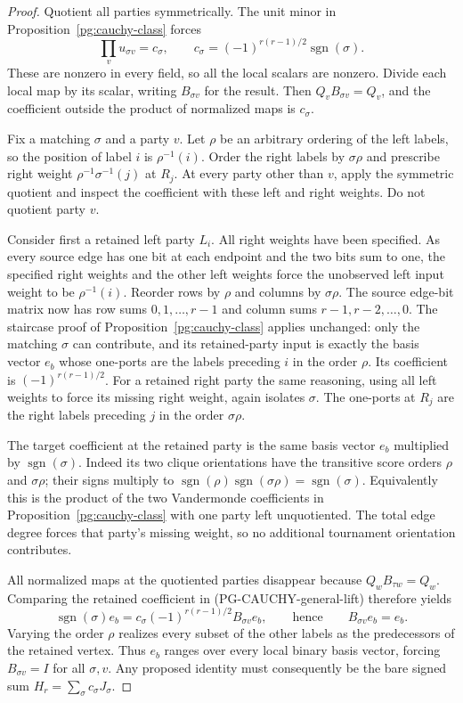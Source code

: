 \begin{proof}
Quotient all parties symmetrically. The unit minor in
Proposition~\ref{pg:cauchy-class} forces
\[
 \prod_vu_{\sigma v}=c_\sigma,
 \qquad c_\sigma=(-1)^{r(r-1)/2}\operatorname{sgn}(\sigma).
\]
These are nonzero in every field, so all the local scalars are nonzero.
Divide each local map by its scalar, writing $B_{\sigma v}$ for the result.
Then $Q_vB_{\sigma v}=Q_v$, and the coefficient outside the product of
normalized maps is $c_\sigma$.

Fix a matching $\sigma$ and a party $v$. Let $\rho$ be an arbitrary ordering
of the left labels, so the position of label $i$ is $\rho^{-1}(i)$.
Order the right labels by $\sigma\rho$ and prescribe right weight
$\rho^{-1}\sigma^{-1}(j)$ at $R_j$. At every party other than $v$, apply
the symmetric quotient and inspect the coefficient with these left and
right weights. Do not quotient party $v$.

Consider first a retained left party $L_i$. All right weights have been
specified. As every source edge has one bit at each endpoint and the two
bits sum to one, the specified right weights and the other left weights
force the unobserved left input weight to be $\rho^{-1}(i)$. Reorder rows
by $\rho$ and columns by $\sigma\rho$. The source edge-bit matrix now has
row sums $0,1,\ldots,r-1$ and column sums $r-1,r-2,\ldots,0$.
The staircase proof of Proposition~\ref{pg:cauchy-class} applies unchanged:
only the matching $\sigma$ can contribute, and its retained-party input is
exactly the basis vector $e_b$ whose one-ports are the labels preceding
$i$ in the order $\rho$. Its coefficient is $(-1)^{r(r-1)/2}$.
For a retained right party the same reasoning, using all left weights to
force its missing right weight, again isolates $\sigma$. The one-ports at
$R_j$ are the right labels preceding $j$ in the order $\sigma\rho$.

The target coefficient at the retained party is the same basis vector
$e_b$ multiplied by $\operatorname{sgn}(\sigma)$. Indeed its two clique
orientations have the transitive score orders $\rho$ and $\sigma\rho$;
their signs multiply to
$\operatorname{sgn}(\rho)\operatorname{sgn}(\sigma\rho)
=\operatorname{sgn}(\sigma)$. Equivalently this is the product of the two
Vandermonde coefficients in Proposition~\ref{pg:cauchy-class} with one
party left unquotiented. The total edge degree forces that party's missing
weight, so no additional tournament orientation contributes.

All normalized maps at the quotiented parties disappear because
$Q_wB_{\tau w}=Q_w$. Comparing the retained coefficient in
(PG-CAUCHY-general-lift) therefore yields
\[
 \operatorname{sgn}(\sigma)e_b
 =c_\sigma(-1)^{r(r-1)/2}B_{\sigma v}e_b,
 \qquad\text{hence}\qquad B_{\sigma v}e_b=e_b.
\]
Varying the order $\rho$ realizes every subset of the other labels as the
predecessors of the retained vertex. Thus $e_b$ ranges over every local
binary basis vector, forcing $B_{\sigma v}=I$ for all $\sigma,v$.
Any proposed identity must consequently be the bare signed sum
$H_r=\sum_\sigma c_\sigma J_\sigma$.


\end{proof}
